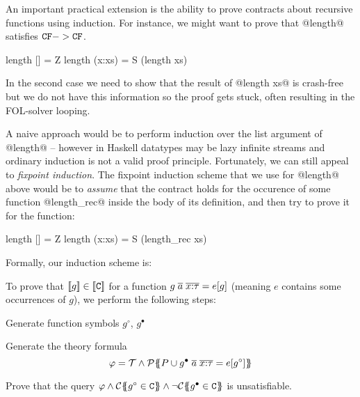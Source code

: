 \label{sect:induction}

An important practical extension is the ability to prove contracts about recursive functions
using induction. For instance, we might want to prove that @length@ satisfies ${\tt CF} -> {\tt CF}$.
\begin{code}
  length []     = Z 
  length (x:xs) = S (length xs)
\end{code}
In the second case we need to show that the result of @length xs@ is crash-free but we do not 
have this information so the proof gets stuck, often resulting in the FOL-solver looping. 

A naive approach would be to perform induction over the list argument of @length@ -- however
in Haskell datatypes may be lazy infinite streams and ordinary induction is not
a valid proof principle. Fortunately, we can still appeal to {\em fixpoint induction}. The 
fixpoint induction scheme that we use for @length@ above would be to {\em assume} that the 
contract holds for the occurence of 
some function @length_rec@ inside the body of its definition, 
and then try to prove it for the function:
\begin{code}
  length []     = Z 
  length (x:xs) = S (length_rec xs)
\end{code}

Formally, our induction scheme is:
\begin{definition}\label{def:induction}
To prove that $[\![g]\!] \in [\![{\tt C}]\!]$ for a function 
$g\;\overline{a}\;\overline{x{:}\tau} = e[g]$ (meaning $e$ contains
some occurrences of $g$), we perform the following steps:
\begin{itemize*}
  \item Generate function symbols $g^{\circ}$, $g^{\bullet}$
  \item Generate the theory formula \[ \varphi = {\cal T} \land 
             {\cal P}\{\!\!\{P \cup g^{\bullet}\;\overline{a}\;\overline{x{:}\tau} = e[g^{\circ}]\}\!\!\} \] 
  \item Prove that the query $\phi \land \ctrans{}{}{g^{\circ} \in \Ct} \land \neg \ctrans{}{}{g^{\bullet} \in \Ct}$
        is unsatisfiable.
\end{itemize*}
\end{definition}

